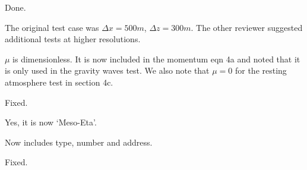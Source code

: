 \documentclass{article}
\begin{document}
\begin{quotation}
\begin{comment}
\item Line 281: `\ldots Courant number \ldots'
\end{comment}
\end{quotation}
Done.

\begin{quotation}
\begin{comment}
\item Section 3d: what is the grid spacing for this test case?
\end{comment}
\end{quotation}
The original test case was $\Delta x = 500m$, $\Delta z = 300m$.  The other reviewer suggested additional tests at higher resolutions.

\begin{quotation}
\begin{comment}
\item Line 344: The physical unit of $\mu$ is missing.
\end{comment}
\end{quotation}
$\mu$ is dimensionless.  It is now included in the momentum eqn 4a and noted that it is only used in the gravity waves test.  We also note that $\mu = 0$ for the resting atmosphere test in section 4c.

\begin{quotation}
\begin{comment}
\item Line 414: `\ldots Charney--Phillips \ldots'
\end{comment}
\end{quotation}
Fixed.

\begin{quotation}
\begin{comment}
\item line 414: I assume that `eta' need to be capitalized here, correct?
\end{comment}
\end{quotation}
Yes, it is now `Meso-Eta'.

\begin{quotation}
\begin{comment}
\item Line 428: reference is incomplete
\end{comment}
\end{quotation}
Now includes type, number and address.

\begin{quotation}
\begin{comment}
\item Line 443: `\ldots Eta model \ldots'
\end{comment}
\end{quotation}
Fixed.
\end{document}
